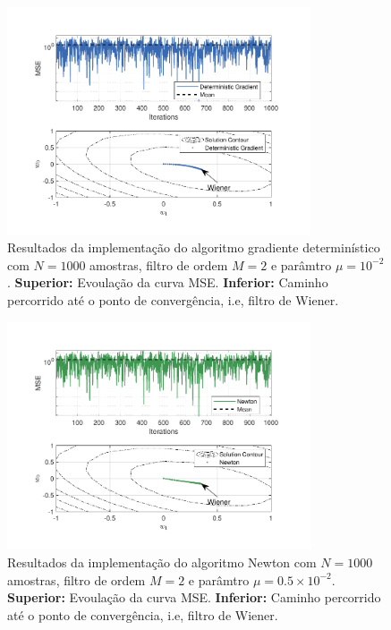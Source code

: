 \begin{figure}[!htp]
    \centering
    \includegraphics[width=0.80\textwidth]{fig/hw3p4-dga.pdf}
    \caption{Resultados da implementação do algoritmo gradiente determinístico com $N = 1000$ amostras, filtro de ordem $M = 2$ e parâmtro $\mu = 10^{-2}$. \textbf{Superior:} Evoulação da curva MSE. \textbf{Inferior:} Caminho percorrido até o ponto de convergência, i.e, filtro de Wiener.}
    \label{fig:hw3p4-dga}
\end{figure}

\begin{figure}[!htp]
    \centering
    \includegraphics[width=0.80\textwidth]{fig/hw3p4-newton.pdf}
    \caption{Resultados da implementação do algoritmo Newton com $N = 1000$ amostras, filtro de ordem $M = 2$ e parâmtro $\mu = 0.5 \times 10^{-2}$. \textbf{Superior:} Evoulação da curva MSE. \textbf{Inferior:} Caminho percorrido até o ponto de convergência, i.e, filtro de Wiener.}
    \label{fig:hw3p4-newton}
\end{figure}

